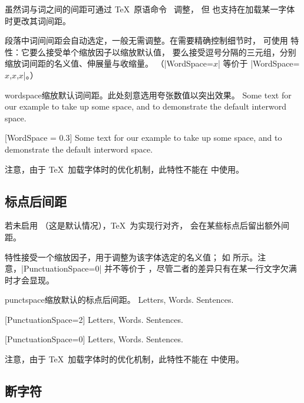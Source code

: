 \documentclass[a4paper]{l3doc}
\begin{document}
虽然词与词之间的间距可通过 \TeX\ 原语命令 \cmd\spaceskip\ 调整，
但  也支持在加载某一字体时更改其词间距。

段落中词间间距会自动选定，一般无需调整。在需要精确控制细节时，
可使用  特性：它要么接受单个缩放因子以缩放默认值，
要么接受逗号分隔的三元组，分别缩放词间距的名义值、伸展量与收缩量。
（|WordSpace={$x$}| 等价于 |WordSpace={$x$,$x$,$x$}|。）

\begingroup
\let\centering\relax
\begin{Xexample}{wordspace}{缩放默认词间距。此处刻意选用夸张数值以突出效果。}
  Some text for our example to take
  up some space, and to demonstrate
  the default interword space.
  \bigskip

    [WordSpace = 0.3]
  Some text for our example to take
  up some space, and to demonstrate
  the default interword space.
\end{Xexample}
\endgroup

注意，由于 \TeX\ 加载字体时的优化机制，此特性不能在  中使用。

\subsection{标点后间距}

若未启用 \cmd\frenchspacing（这是默认情况），\TeX\ 为实现行对齐，
会在某些标点后留出额外间距。

 特性接受一个缩放因子，用于调整为该字体选定的名义值；
如  所示。注意，|PunctuationSpace=0| 并不等价于
\cmd\frenchspacing，尽管二者的差异只有在某一行文字欠满时才会显现。

\begin{Lexample}{punctspace}{缩放默认的标点后间距。}
  \nonfrenchspacing
   Letters, Words. Sentences.          \par
  [PunctuationSpace=2]
   Letters, Words. Sentences.          \par
  [PunctuationSpace=0]
   Letters, Words. Sentences.
\end{Lexample}

注意，由于 \TeX\ 加载字体时的优化机制，此特性不能在  中使用。



\subsection{断字符}
\end{document}
